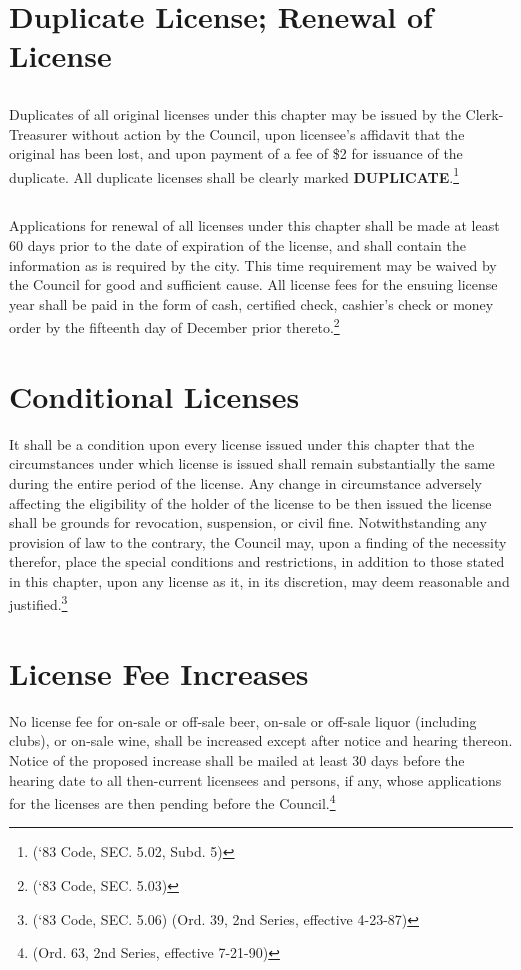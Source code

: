 \section{Duplicate License; Renewal of License}
\subsection{}
Duplicates of all original licenses under this chapter may be issued by the Clerk-Treasurer without action by the Council, upon licensee’s affidavit that the original has been lost, and upon payment of a fee of \$2 for issuance of the duplicate.  All duplicate licenses shall be clearly marked \textbf{DUPLICATE}.\footnote{(‘83 Code, SEC. 5.02, Subd. 5)}
\subsection{}
Applications for renewal of all licenses under this chapter shall be made at least 60 days prior to the date of expiration of the license, and shall contain the information as is required by the city.  This time requirement may be waived by the Council for good and sufficient cause.  All license fees for the ensuing license year shall be paid in the form of cash, certified check, cashier’s check or money order by the fifteenth day of December prior thereto.\footnote{(‘83 Code, SEC. 5.03)}

\section{Conditional Licenses}
It shall be a condition upon every license issued under this chapter that the circumstances under which license is issued shall remain substantially the same during the entire period of the license.  Any change in circumstance adversely affecting the eligibility of the holder of the license to be then issued the license shall be grounds for revocation, suspension, or civil fine.  Notwithstanding any provision of law to the contrary, the Council may, upon a finding of the necessity therefor, place the special conditions and restrictions, in addition to those stated in this chapter, upon any license as it, in its discretion, may deem reasonable and justified.\footnote{(‘83 Code, SEC. 5.06)  (Ord. 39, 2nd Series, effective 4-23-87)}

\section{License Fee Increases}
No license fee for on-sale or off-sale beer, on-sale or off-sale liquor (including clubs), or on-sale wine, shall be increased except after notice and hearing thereon.  Notice of the proposed increase shall be mailed at least 30 days before the hearing date to all then-current licensees and persons, if any, whose applications for the licenses are then pending before the Council.\footnote{(Ord. 63, 2nd Series, effective 7-21-90)}

